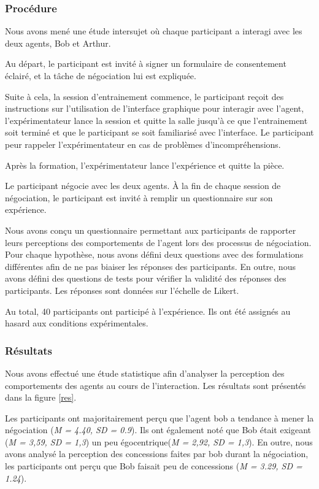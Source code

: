 {			\subsubsection{Procédure}
		Nous avons mené une étude intersujet où chaque participant a interagi avec les deux agents, Bob et Arthur.
		
		Au départ, le participant est invité à signer un formulaire de consentement éclairé, et  la tâche de négociation lui est expliquée. 
		
		Suite à cela, la  session d'entrainement commence, le participant reçoit des instructions sur l'utilisation de l'interface graphique pour interagir avec l'agent, l'expérimentateur lance la session et quitte la salle jusqu'à ce que l'entrainement soit terminé et que le participant se soit familiarisé avec l'interface. Le participant peur rappeler l'expérimentateur en cas de problèmes d'incompréhensions. 
		
		Après la formation, l'expérimentateur lance l'expérience et quitte la pièce. 
		
		Le participant négocie avec les deux agents. À la fin de chaque session de négociation, le participant est invité à remplir un questionnaire sur son expérience.
		
		Nous avons conçu un questionnaire permettant aux participants de rapporter leurs perceptions des comportements de l'agent lors des processus de négociation. Pour chaque hypothèse, nous avons défini deux questions avec des formulations différentes afin de ne pas biaiser les réponses des participants. En outre, nous avons défini des questions de tests pour vérifier la validité des réponses des participants. Les réponses sont données sur l'échelle de Likert.
		
		Au total, 40 participants ont participé à l'expérience. Ils ont été assignés au hasard aux conditions expérimentales.
		
		\subsubsection{Résultats}
		
		Nous avons effectué une étude statistique afin d'analyser la perception des comportements des agents au cours de l'interaction. Les résultats sont présentés dans la figure \ref{res}.
		
		Les participants ont majoritairement perçu que l'agent bob a tendance à mener la négociation (\emph {M = 4.40, SD = 0.9}). Ils ont également noté que Bob était exigeant (\emph {M = 3,59, SD = 1,3}) un peu égocentrique(\emph {M = 2,92, SD = 1,3}). En outre, nous avons analysé la perception des concessions faites par bob durant la négociation, les participants ont perçu que Bob faisait peu de concessions (\emph {M = 3.29, SD = 1.24}).
		
}
